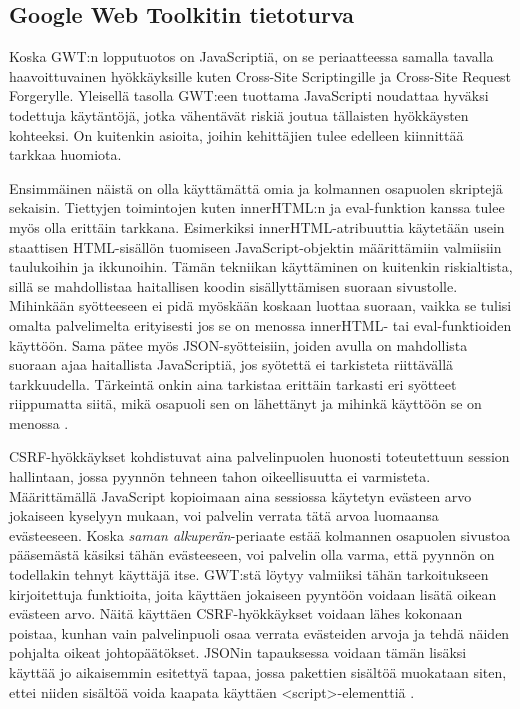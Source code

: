 \subsection{Google Web Toolkitin tietoturva}

Koska GWT:n lopputuotos on JavaScriptiä, on se periaatteessa samalla tavalla haavoittuvainen hyökkäyksille kuten Cross-Site Scriptingille ja Cross-Site Request Forgerylle. Yleisellä tasolla 
GWT:een tuottama JavaScripti noudattaa hyväksi todettuja käytäntöjä, jotka vähentävät riskiä joutua tällaisten hyökkäysten kohteeksi. On kuitenkin asioita, joihin kehittäjien tulee edelleen
kiinnittää tarkkaa huomiota. 

Ensimmäinen näistä on olla käyttämättä omia ja kolmannen osapuolen skriptejä sekaisin. Tiettyjen toimintojen kuten innerHTML:n ja eval-funktion kanssa tulee myös olla erittäin tarkkana.
Esimerkiksi innerHTML-atribuuttia käytetään usein staattisen HTML-sisällön tuomiseen JavaScript-objektin määrittämiin valmiisiin taulukoihin ja ikkunoihin. Tämän tekniikan käyttäminen on 
kuitenkin riskialtista, sillä se mahdollistaa haitallisen koodin sisällyttämisen suoraan sivustolle. Mihinkään syötteeseen ei pidä myöskään koskaan luottaa suoraan, vaikka se tulisi omalta 
palvelimelta erityisesti jos se on menossa innerHTML- tai eval-funktioiden käyttöön. Sama pätee myös JSON-syötteisiin, joiden avulla on mahdollista suoraan ajaa haitallista JavaScriptiä, jos 
syötettä ei tarkisteta riittävällä tarkkuudella. Tärkeintä onkin aina tarkistaa erittäin tarkasti eri syötteet riippumatta siitä, mikä osapuoli sen on lähettänyt ja mihinkä käyttöön se on
menossa \cite{GWTsecurity}.

CSRF-hyökkäykset kohdistuvat aina palvelinpuolen huonosti toteutettuun session hallintaan, jossa pyynnön tehneen tahon oikeellisuutta ei varmisteta. Määrittämällä JavaScript kopioimaan aina 
sessiossa käytetyn evästeen arvo jokaiseen kyselyyn mukaan, voi palvelin verrata tätä arvoa luomaansa evästeeseen. Koska \emph{saman alkuperän}-periaate estää kolmannen osapuolen sivustoa 
pääsemästä käsiksi tähän evästeeseen, voi palvelin olla varma, että pyynnön on todellakin tehnyt käyttäjä itse. GWT:stä löytyy valmiiksi tähän tarkoitukseen kirjoitettuja funktioita, joita
käyttäen jokaiseen pyyntöön voidaan lisätä oikean evästeen arvo. Näitä käyttäen CSRF-hyökkäykset voidaan lähes kokonaan poistaa, kunhan vain palvelinpuoli osaa verrata evästeiden arvoja 
ja tehdä näiden pohjalta oikeat johtopäätökset. JSONin tapauksessa voidaan tämän lisäksi käyttää jo aikaisemmin esitettyä tapaa, jossa pakettien sisältöä muokataan siten, ettei niiden
sisältöä voida kaapata käyttäen <script>-elementtiä \cite{GWTsecurity}.

